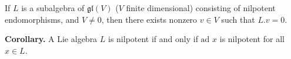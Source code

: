 If $L$ is a subalgebra of $\mathfrak{gl}(V)$ ($V$ finite dimensional) consisting of nilpotent endomorphisms, and $V \neq 0$, then there exists nonzero $v \in V$ such that $L.v = 0$.

\textbf{Corollary.} A Lie algebra $L$ is nilpotent if and only if $\text{ad } x$ is nilpotent for all $x \in L$.
